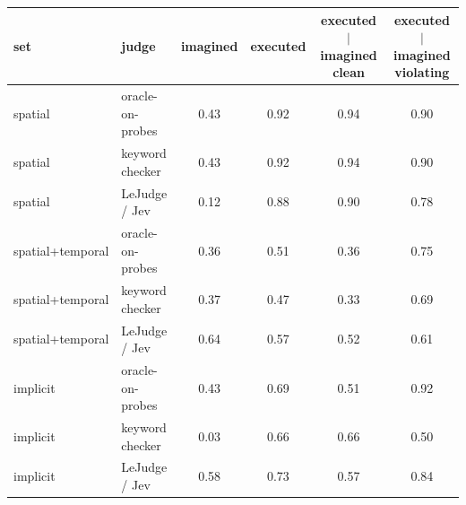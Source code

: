 \begin{tabular}{llcccc}
\toprule
set & judge & imagined & executed & executed $\mid$ imagined clean & executed $\mid$ imagined violating \\
\midrule
spatial & oracle-on-probes & 0.43 & 0.92 & 0.94 & 0.90 \\
spatial & keyword checker & 0.43 & 0.92 & 0.94 & 0.90 \\
spatial & LeJudge / Jev & 0.12 & 0.88 & 0.90 & 0.78 \\
spatial+temporal & oracle-on-probes & 0.36 & 0.51 & 0.36 & 0.75 \\
spatial+temporal & keyword checker & 0.37 & 0.47 & 0.33 & 0.69 \\
spatial+temporal & LeJudge / Jev & 0.64 & 0.57 & 0.52 & 0.61 \\
implicit & oracle-on-probes & 0.43 & 0.69 & 0.51 & 0.92 \\
implicit & keyword checker & 0.03 & 0.66 & 0.66 & 0.50 \\
implicit & LeJudge / Jev & 0.58 & 0.73 & 0.57 & 0.84 \\
\bottomrule
\end{tabular}